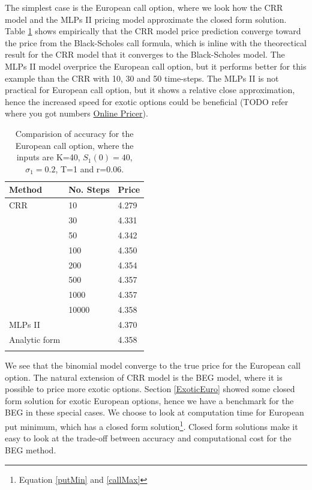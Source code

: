 The simplest case is the European call option, where we look how the CRR model and the MLPs II pricing model approximate the closed form solution. Table \ref{tab:EuroCall} shows empirically that the CRR model price prediction converge toward the price from the Black-Scholes call formula, which is inline with the theorectical result for the CRR model that it converges to the Black-Scholes model. The MLPs II model overprice the European call option, but it performs better for this example than the CRR with 10, 30 and 50 time-steps. The MLPs II is not practical for European call option, but it shows a relative close approximation, hence the increased speed for exotic options could be beneficial (TODO refer where you got numbers \href{https://www.rocq.inria.fr/mathfi/Premia/index.html}{Online Pricer}).\\

\begin{table}[th]
\caption{Comparision of accuracy for the European call option, where the inputs are K=40, $S_1(0)=40$, $\sigma_1=0.2$, T=1 and r=0.06.}
\label{tab:EuroCall}
\centering
\begin{tabular}{l l l}
\toprule
\textbf{Method} & \textbf{No. Steps} & \textbf{Price} \\
\midrule
CRR & 10 & 4.279\\
& 30 & 4.331\\
& 50 & 	4.342\\
& 100 & 4.350\\
& 200 & 4.354\\
& 500 & 4.357\\
& 1000 & 4.357\\
& 10000 & 4.358\\
MLPs II & & 4.370\\
Analytic form & & 4.358\\
\bottomrule\\
\end{tabular}
\end{table}

We see that the binomial model converge to the true price for the European call option. The natural extension of CRR model is the BEG model, where it is possible to price more exotic options. Section \ref{ExoticEuro} showed some closed form solution for exotic European options, hence we have a benchmark for the BEG in these special cases. We choose to look at computation time for European put minimum, which has a closed form solution\footnote{Equation \eqref{putMin} and \eqref{callMax}}. Closed form solutions make it easy to look at the trade-off between accuracy and computational cost for the BEG method. \\


